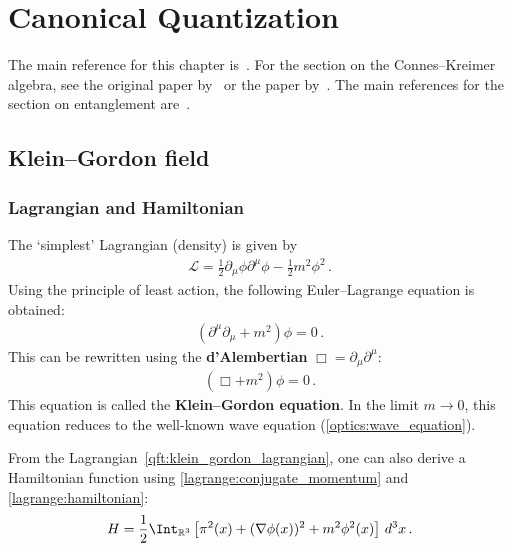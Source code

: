 \chapter{Canonical Quantization}

    The main reference for this chapter is~\citet{peskin_introduction_1995}. For the section on the Connes--Kreimer algebra, see the original paper by~\citet{connes_hopf_1998} or the paper by~\citet{ebrahimi-fard_hopf_2005}. The main references for the section on entanglement are~\citet{tuybens_entanglement_2017,rangamani_holographic_2017}.

\section{Klein--Gordon field}
\subsection{Lagrangian and Hamiltonian}

    The `simplest' Lagrangian (density) is given by
    \begin{gather}
        \label{qft:klein_gordon_lagrangian}
        \mathcal{L} = \frac{1}{2}\partial_\mu\phi\partial^\mu\phi - \frac{1}{2}m^2\phi^2\,.
    \end{gather}
    Using the principle of least action, the following Euler--Lagrange equation is obtained:
    \begin{gather}
        \left(\partial^\mu\partial_\mu + m^2\right)\phi = 0\,.
    \end{gather}
    This can be rewritten using the \textbf{d'Alembertian} $\Box = \partial_\mu\partial^\mu$:
    \begin{gather}
        \label{qft:klein_gordon_equation}
        (\Box+m^2)\phi = 0\,.
    \end{gather}
    This equation is called the \textbf{Klein--Gordon equation}. In the limit $m\longrightarrow0$, this equation reduces to the well-known wave equation (\cref{optics:wave_equation}).

    From the Lagrangian~\eqref{qft:klein_gordon_lagrangian}, one can also derive a Hamiltonian function using \cref{lagrange:conjugate_momentum} and \cref{lagrange:hamiltonian}:
    \begin{gather}
        \label{qft:klein_gordon_hamiltonian}
        H = \frac{1}{2}\Int_{\mathbb{R}^3}\left[\pi^2(x) + (\nabla\phi(x))^2 + m^2\phi^2(x)\right]\,d^3x\,.
    \end{gather}

